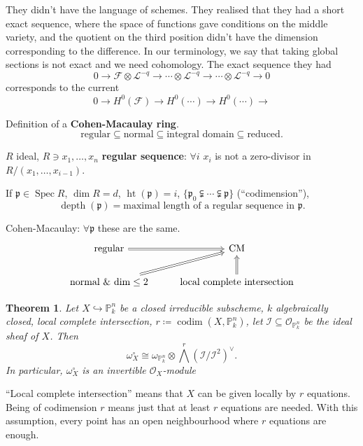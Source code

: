 \documentclass[12pt]{article}
\DeclareMathOperator{\Spec}{Spec}
\DeclareMathOperator{\codim}{codim}
\DeclareMathOperator{\height}{ht}
\DeclareMathOperator{\depth}{depth}
\newtheorem*{theorem}{Theorem}
\theoremstyle{definition}
\begin{document}
They didn't have the language of schemes. They realised that they had a short exact sequence, where the space of functions gave conditions on the middle variety, and the quotient on the third position didn't have the dimension corresponding to the difference. In our terminology, we say that taking global sections is not exact and we need cohomology. The exact sequence they had
\[0\longrightarrow\mathcal F\otimes\mathcal L^{-q}\longrightarrow\cdots\otimes\mathcal L^{-q}\longrightarrow\cdots\otimes\mathcal L^{-q}\longrightarrow0\]
corresponds to the current
\[0\longrightarrow H^0(\mathcal F)\longrightarrow H^0(\cdots)\longrightarrow H^0(\cdots)\longrightarrow\]

Definition of a \textbf{Cohen-Macaulay ring}.
\[\text{regular}\subseteq\text{normal}\subseteq\text{integral domain}\subseteq\text{reduced}.\]

$R$ ideal, $R\ni x_1,\ldots,x_n$ \textbf{regular sequence}: $\forall i$ $x_i$ is not a zero-divisor in $R/(x_1,\ldots,x_{i-1})$.

If $\mathfrak p\in\Spec R$, $\dim R=d$, $\height(\mathfrak p)=i$, $\{\mathfrak p_0\subsetneqq\cdots\subsetneqq\mathfrak p\}$ (``codimension''),
\[\depth(\mathfrak p)=\text{maximal length of a regular sequence in }\mathfrak p.\]

Cohen-Macaulay: $\forall\mathfrak p$ these are the same.
\[\begin{tikzcd}\text{regular}\arrow[r,Rightarrow]&\text{CM}\\\text{normal \& dim}\leq2\arrow[ru,Rightarrow]&\text{local complete intersection}\arrow[u,Rightarrow]\end{tikzcd}\]

\begin{theorem}
Let $X\hookrightarrow\mathbb P_k^n$ be a closed irreducible subscheme, $k$ algebraically closed, local complete intersection, $r\coloneqq\codim(X,\mathbb P_k^n)$, let $\mathcal I\subseteq\mathcal O_{\mathbb P_k^n}$ be the ideal sheaf of $X$. Then
\[\omega_X^\circ\cong\omega_{\mathbb P_k^n}\otimes{\bigwedge}^r(\mathcal I/\mathcal I^2)^\vee.\]
In particular, $\omega_X^\circ$ is an invertible $\mathcal O_X$-module
\end{theorem}

``Local complete intersection'' means that $X$ can be given locally by $r$ equations. Being of codimension $r$ means just that at least $r$ equations are needed. With this assumption, every point has an open neighbourhood where $r$ equations are enough.
\end{document}
